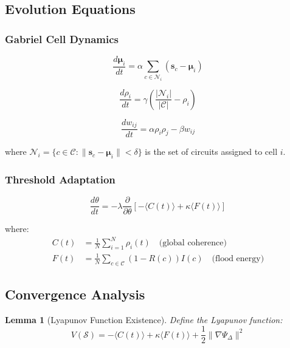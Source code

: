 \documentclass[11pt,a4paper]{article}
\newtheorem{lemma}[theorem]{Lemma}
\begin{document}
\subsection{Evolution Equations}

\subsubsection{Gabriel Cell Dynamics}

\begin{equation}
\frac{d\boldsymbol{\mu}_i}{dt} = \alpha \sum_{c \in \mathcal{N}_i} (\mathbf{s}_c - \boldsymbol{\mu}_i)
\end{equation}

\begin{equation}
\frac{d\rho_i}{dt} = \gamma \left( \frac{|\mathcal{N}_i|}{|\mathcal{C}|} - \rho_i \right)
\end{equation}

\begin{equation}
\frac{dw_{ij}}{dt} = \alpha \rho_i \rho_j - \beta w_{ij}
\end{equation}

where $\mathcal{N}_i = \{c \in \mathcal{C} : \|\mathbf{s}_c - \boldsymbol{\mu}_i\| < \delta\}$ is the set of circuits assigned to cell $i$.

\subsubsection{Threshold Adaptation}

\begin{equation}
\frac{d\theta}{dt} = -\lambda \frac{\partial}{\partial \theta} \left[ -\langle C(t) \rangle + \kappa \langle F(t) \rangle \right]
\end{equation}

where:
\begin{align}
C(t) &= \frac{1}{N} \sum_{i=1}^{N} \rho_i(t) \quad \text{(global coherence)} \\
F(t) &= \frac{1}{N} \sum_{c \in \mathcal{C}} (1 - R(c)) I(c) \quad \text{(flood energy)}
\end{align}

\subsection{Convergence Analysis}

\begin{lemma}[Lyapunov Function Existence]
Define the Lyapunov function:
\begin{equation}
V(\mathcal{S}) = -\langle C(t) \rangle + \kappa \langle F(t) \rangle + \frac{1}{2}\|\nabla \Psi_\Delta\|^2
\end{equation}
\end{lemma}
\end{document}

